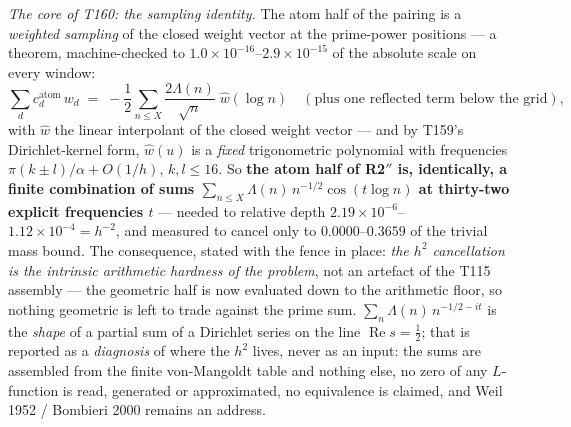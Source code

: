 \documentclass[11pt,a4paper]{article}
\begin{document}
\emph{The core of T160: the sampling identity.} The atom half of the pairing is a
\emph{weighted sampling} of the closed weight vector at the prime-power
positions --- a theorem, machine-checked to $1.0\times10^{-16}$--$2.9\times
10^{-15}$ of the absolute scale on every window:
\[
\sum_d c^{\mathrm{atom}}_d\,w_d
\;=\;-\frac12\sum_{n\le X}\frac{2\Lambda(n)}{\sqrt n}\;\widehat w(\log n)
\quad(\text{plus one reflected term below the grid}),
\]
with $\widehat w$ the linear interpolant of the closed weight vector --- and by
T159's Dirichlet-kernel form, $\widehat w(u)$ is a \emph{fixed} trigonometric
polynomial with frequencies $\pi(k\pm l)/\alpha+O(1/h)$, $k,l\le16$. So
\textbf{the atom half of R2$''$ is, identically, a finite combination of sums
$\sum_{n\le X}\Lambda(n)\,n^{-1/2}\cos(t\log n)$ at thirty-two explicit
frequencies $t$} --- needed to relative depth $2.19\times10^{-6}$--$1.12\times
10^{-4}=h^{-2}$, and measured to cancel only to $0.0000$--$0.3659$ of the trivial
mass bound. The consequence, stated with the fence in place: \emph{the $h^2$
cancellation is the intrinsic arithmetic hardness of the problem}, not an
artefact of the T115 assembly --- the geometric half is now evaluated down to the
arithmetic floor, so nothing geometric is left to trade against the prime sum.
$\sum_n\Lambda(n)\,n^{-1/2-it}$ is the \emph{shape} of a partial sum of a
Dirichlet series on the line $\operatorname{Re}s=\tfrac12$; that is reported as a
\emph{diagnosis} of where the $h^2$ lives, never as an input: the sums are
assembled from the finite von-Mangoldt table and nothing else, no zero of any
$L$-function is read, generated or approximated, no equivalence is claimed, and
Weil 1952 / Bombieri 2000 remains an address.
\end{document}
